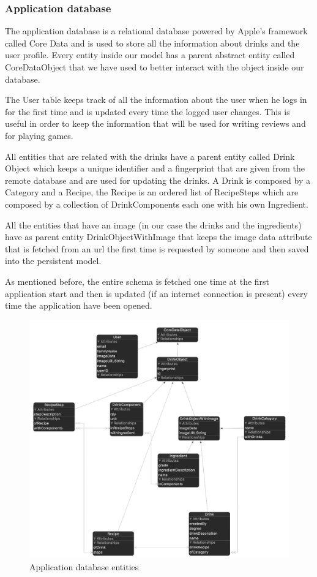 \documentclass[paper=a4, fontsize=12pt]{scrartcl}
\numberwithin{equation}{section}		%
\numberwithin{figure}{section}			%
\numberwithin{table}{section}				%
\begin{document}
\subsubsection{Application database}
The application database is a relational database powered by Apple's framework called Core Data and is used to store all the information about drinks and the user profile. Every entity inside our model has a parent abstract entity called CoreDataObject that we have used to better interact with the object inside our database.

The User table keeps track of all the information about the user when he logs in for the first time and is updated every time the logged user changes. This is useful in order to keep the information that will be used for writing reviews and for playing games.


All entities that  are related with the drinks have a parent entity called Drink Object which keeps a unique identifier and a fingerprint that are given from the remote database and are used for updating the drinks. A Drink is composed by a Category and a Recipe, the Recipe is an ordered list of RecipeSteps which are composed by a collection of DrinkComponents each one with his own Ingredient.

All the entities that have an image (in our case the drinks and the ingredients) have as parent entity DrinkObjectWithImage that keeps the image data attribute that is fetched from an url the first time is requested by someone and then saved into the persistent model.\par
As mentioned before, the entire schema is fetched one time at the first application start and then is updated (if an internet connection is present) every time the application have been opened.

\begin{figure}[H]
\begin{center}
    \includegraphics[width=\linewidth]{entities.png}
    \caption{Application database entities}
    \label{Database entities}
\end{center}
\end{figure}
\end{document}

